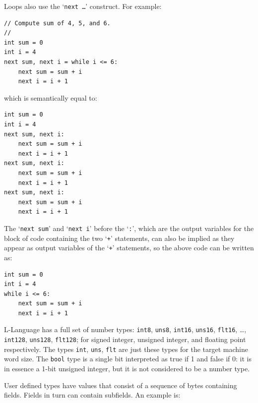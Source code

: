\documentclass[12pt]{article}
\newenvironment{indpar}[1][0.3in]%
	{\begin{list}{}%
		     {\setlength{\itemsep}{0in}%
		      \setlength{\topsep}{0in}%
		      \setlength{\parsep}{1ex}%
		      \setlength{\labelwidth}{#1}%
		      \setlength{\leftmargin}{#1}%
		      \addtolength{\leftmargin}{\labelsep}}%
	 \item}%
	{\end{list}}
\begin{document}
Loops also use the `{\tt next \ldots}' construct.  For example:
\begin{indpar}\begin{verbatim}
// Compute sum of 4, 5, and 6.
//
int sum = 0
int i = 4
next sum, next i = while i <= 6:
    next sum = sum + i
    next i = i + 1
\end{verbatim}\end{indpar}
which is semantically equal to:
\begin{indpar}\begin{verbatim}
int sum = 0
int i = 4
next sum, next i:
    next sum = sum + i
    next i = i + 1
next sum, next i:
    next sum = sum + i
    next i = i + 1
next sum, next i:
    next sum = sum + i
    next i = i + 1
\end{verbatim}\end{indpar}
The `{\tt next sum}' and `{\tt next i}' before the `{\tt :}',
which are the output variables for the block of code containing
the two `{\tt +}' statements,
can also be implied as they appear as output variables
of the `{\tt +}' statements, so the above code can be written as:
\begin{indpar}\begin{verbatim}
int sum = 0
int i = 4
while i <= 6:
    next sum = sum + i
    next i = i + 1
\end{verbatim}\end{indpar}

L-Language has a full set of number types:
{\tt int8}, {\tt uns8},
{\tt int16}, {\tt uns16}, {\tt flt16}, \ldots,
{\tt int128}, {\tt uns128}, {\tt flt128}; for signed integer,
unsigned integer, and floating point respectively.
The types {\tt int}, {\tt uns}, {\tt flt} are just these
types for the target machine word size.
The {\tt bool} type is a single bit interpreted as true if
1 and false if 0: it is in essence a 1-bit unsigned integer, but it
is not considered to be a number type.

User defined types have values that
consist of a sequence of bytes containing fields.
Fields in turn can contain subfields.
An example is:
\end{document}
